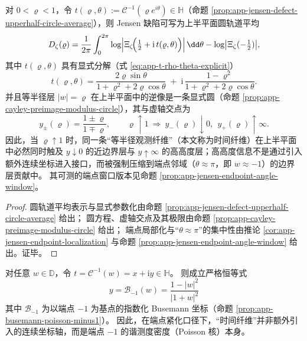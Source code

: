 \begin{theorem}[时间纤维双端触及与端点压缩]\label{thm:dephys-timefiber-two-ended}
对 \(0<\varrho<1\)，令 \(t(\varrho,\theta):=\mathcal{C}^{-1}(\varrho e^{i\theta})\in\mathbb{H}\)（命题 \ref{prop:app-jensen-defect-upperhalf-circle-average}），则 Jensen 缺陷可写为上半平面圆轨道平均
\[
D_{\zeta}(\varrho)=\frac{1}{2\pi}\int_{0}^{2\pi}\log\Bigl|\Xi_{\zeta}\!\Bigl(\tfrac12+\mathrm{i}\,t(\varrho,\theta)\Bigr)\Bigr|\,\dd\theta
-\log\bigl|\Xi_{\zeta}(-\tfrac12)\bigr|,
\]
其中 \(t(\varrho,\theta)\) 具有显式分解（式 \eqref{eq:app-t-rho-theta-explicit}）
\[
t(\varrho,\theta)
=\frac{2\varrho\sin\theta}{1+\varrho^2+2\varrho\cos\theta}
\;+\;
\mathrm{i}\,\frac{1-\varrho^2}{1+\varrho^2+2\varrho\cos\theta}.
\]
并且等半径层 \(|w|=\varrho\) 在上半平面中的逆像是一条显式圆（命题 \ref{prop:app-cayley-preimage-modulus-circle}），其与虚轴交点为
\[
y_{\pm}(\varrho)=\frac{1\pm\varrho}{1\mp\varrho},
\qquad
\varrho\uparrow 1\ \Longrightarrow\ y_{-}(\varrho)\downarrow 0,\ \ y_{+}(\varrho)\uparrow\infty.
\]
因此，当 \(\varrho\uparrow 1\) 时，同一条“等半径观测纤维”（本文称为时间纤维）在上半平面中必然同时触及
\(y\downarrow 0\) 的近边界层与 \(y\uparrow\infty\) 的高高度层；高高度信息不是通过引入额外连续坐标进入接口，而被强制压缩到端点邻域（\(\theta\approx\pi\)，即 \(w\approx-1\)）的边界层贡献中。
其可测的端点窗口版本见命题 \ref{prop:app-jensen-endpoint-angle-window}。
\end{theorem}

\begin{proof}
圆轨道平均表示与显式参数化由命题 \ref{prop:app-jensen-defect-upperhalf-circle-average} 给出；
圆方程、虚轴交点及其极限由命题 \ref{prop:app-cayley-preimage-modulus-circle} 给出；
端点局部化与“\(\theta\approx\pi\)”的集中性由推论 \ref{cor:app-jensen-endpoint-localization} 与命题 \ref{prop:app-jensen-endpoint-angle-window} 给出。证毕。
\end{proof}

\begin{corollary}\label{cor:dephys-poisson-busemann-timefiber}
对任意 \(w\in\mathbb{D}\)，令 \(t=\mathcal{C}^{-1}(w)=x+\mathrm{i}y\in\mathbb{H}\)。
则成立严格恒等式
\[
\boxed{\;y=\mathcal{B}_{-1}(w)=\frac{1-|w|^2}{|1+w|^2}\;}
\]
其中 \(\mathcal{B}_{-1}\) 为以端点 \(-1\) 为基点的指数化 Busemann 坐标（命题 \ref{prop:app-busemann-poisson-minus1}）。
因此，在端点紧化口径下，“时间纤维”并非额外引入的连续坐标轴，而是端点 \(-1\) 的谐测度密度（Poisson 核）本身。
\end{corollary}


